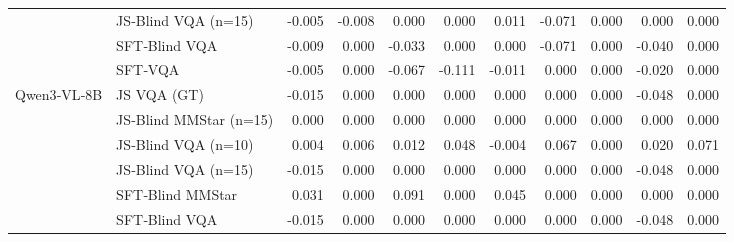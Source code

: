 \begin{tabular}{llrrrrrrrrr}
 &  JS‑Blind VQA (n=15) & -0.005 & -0.008 & 0.000 & 0.000 & 0.011 & -0.071 & 0.000 & 0.000 & 0.000 \\
 &  SFT‑Blind VQA & -0.009 & 0.000 & -0.033 & 0.000 & 0.000 & -0.071 & 0.000 & -0.040 & 0.000 \\
 &  SFT‑VQA & -0.005 & 0.000 & -0.067 & -0.111 & -0.011 & 0.000 & 0.000 & -0.020 & 0.000 \\
\cline{1-11}
\multirow[t]{6}{*}{Qwen3‑VL‑8B} &  JS VQA (GT) & -0.015 & 0.000 & 0.000 & 0.000 & 0.000 & 0.000 & 0.000 & -0.048 & 0.000 \\
 &  JS‑Blind MMStar (n=15) & 0.000 & 0.000 & 0.000 & 0.000 & 0.000 & 0.000 & 0.000 & 0.000 & 0.000 \\
 &  JS‑Blind VQA (n=10) & 0.004 & 0.006 & 0.012 & 0.048 & -0.004 & 0.067 & 0.000 & 0.020 & 0.071 \\
 &  JS‑Blind VQA (n=15) & -0.015 & 0.000 & 0.000 & 0.000 & 0.000 & 0.000 & 0.000 & -0.048 & 0.000 \\
 &  SFT‑Blind MMStar & 0.031 & 0.000 & 0.091 & 0.000 & 0.045 & 0.000 & 0.000 & 0.000 & 0.000 \\
 &  SFT‑Blind VQA & -0.015 & 0.000 & 0.000 & 0.000 & 0.000 & 0.000 & 0.000 & -0.048 & 0.000 \\
\cline{1-11}
\bottomrule
\end{tabular}
